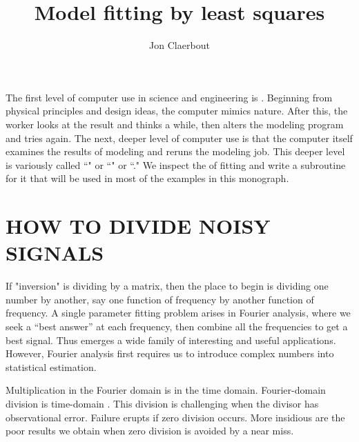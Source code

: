 
\title{Model fitting by least squares}
\author{Jon Claerbout}

\maketitle

\label{paper:lsq}

\def\ff{{\bf f}}
\def\dd{{\bf d}}

\par
The first level of computer use in science and engineering is .
Beginning from physical principles and design ideas,
the computer mimics nature.
After this, the worker looks at the result and thinks a while,
then alters the modeling program and tries again.
The next, deeper level of computer use is that the computer itself
examines the results of modeling and reruns the modeling job.
This deeper level
is variously called
``" or
``" or
``."
We inspect the  of fitting
and write a subroutine for it that will be used in most of
the examples in this monograph.

\section{HOW TO DIVIDE NOISY SIGNALS}
If "inversion" is dividing by a matrix,
then the place to begin is dividing one number by another,
say one function of frequency by another function of frequency.
A single parameter fitting problem arises in Fourier analysis,
where we seek a ``best answer'' at each frequency,
then combine all the frequencies to get a best signal.
Thus emerges a wide family of interesting and useful applications.
However, Fourier analysis first requires us to introduce complex numbers
into statistical estimation.
\par
Multiplication in the Fourier domain is  in the time domain.
Fourier-domain division is time-domain .
This division is challenging when the divisor has observational error.
Failure erupts if zero division occurs.
More insidious are the poor results we obtain
when zero division is avoided by a near miss.

